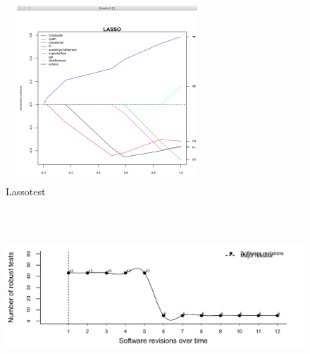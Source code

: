 \begin{figure}
\makeatletter 
\renewcommand{\thefigure}{\@arabic\c@figure}
\makeatother
    \centering
  \includegraphics[width=3in,height=2.6in]{./Figures/lassotest.png}
  \caption{Lassotest}
  \label{fig:lassotest} 
\end{figure}
\begin{figure}
\makeatletter 
\renewcommand{\thefigure}{\@arabic\c@figure}
\makeatother
    \centering
  \includegraphics[width=6in,height=2.6in]{./Figures/moodlerq1pic.png}
\end{figure}
